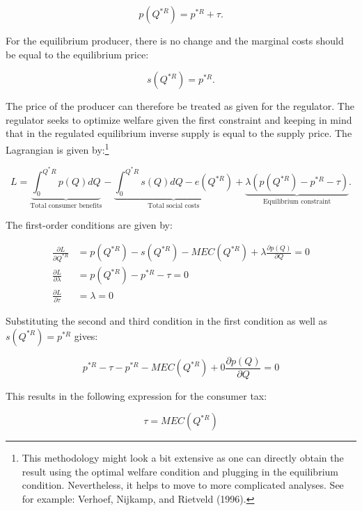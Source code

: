 \documentclass[
]{book}
\begin{document}
\begin{equation}
p(Q^{\ast R}) = p^{\ast R} + \tau.
\end{equation}

For the equilibrium producer, there is no change and the marginal costs should be equal to the equilibrium price:

\begin{equation}
s(Q^{\ast R}) = p^{\ast R}.
\end{equation}

The price of the producer can therefore be treated as given for the regulator. The regulator seeks to optimize welfare given the first constraint and keeping in mind that in the regulated equilibrium inverse supply is equal to the supply price. The Lagrangian is given by:\footnote{This methodology might look a bit extensive as one can directly obtain the result using the optimal welfare condition and plugging in the equilibrium condition. Nevertheless, it helps to move to more complicated analyses. See for example: Verhoef, Nijkamp, and Rietveld (1996).}

\begin{equation}
L = \underbrace{\int_0^{Q^\ast R} p(Q)dQ}_\text{Total consumer benefits} - \underbrace{\int^{Q^\ast R}_0 s(Q)dQ - e(Q^{\ast R})}_\text{Total social costs} + \underbrace{\lambda(p(Q^{\ast R}) - p^{\ast R} - \tau)}_\text{Equilibrium constraint}.
\end{equation}

The first-order conditions are given by:

\begin{align}
\frac{\partial L}{\partial Q^{\ast R}} &= p(Q^{\ast R}) - s(Q^{\ast R}) - MEC(Q^{\ast R}) + \lambda \frac{\partial p(Q)}{\partial Q} = 0 \\
\frac{\partial L}{\partial \lambda} &= p(Q^{\ast R}) - p^{\ast R} - \tau = 0 \\
\frac{\partial L}{\partial \tau} &= \lambda = 0
\end{align}

Substituting the second and third condition in the first condition as well as \(s(Q^{\ast R}) =p^{*R}\) gives:

\begin{equation}
p^{*R} - \tau - p^{*R} - MEC(Q^{* R}) + 0 \frac{\partial p(Q)}{\partial Q} = 0
\end{equation}

This results in the following expression for the consumer tax:

\begin{equation}
\tau = MEC(Q^{* R})
\end{equation}
\end{document}
